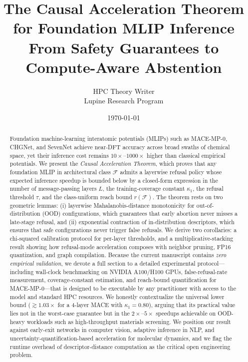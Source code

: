 \documentclass[11pt,a4paper]{article}
\title{\textbf{The Causal Acceleration Theorem for Foundation MLIP Inference}\\\large From Safety Guarantees to Compute-Aware Abstention}
\author{HPC Theory Writer\\Lupine Research Program}
\date{\today}
\begin{document}
\maketitle

\begin{center}
\end{center}

\begin{abstract}
Foundation machine-learning interatomic potentials (MLIPs) such as MACE-MP-0, CHGNet, and SevenNet achieve near-DFT accuracy across broad swaths of chemical space, yet their inference cost remains $10\times$--$1000\times$ higher than classical empirical potentials. We present the \emph{Causal Acceleration Theorem}, which proves that any foundation MLIP in architectural class $\mathcal{F}$ admits a layerwise refusal policy whose expected inference speedup is bounded below by a closed-form expression in the number of message-passing layers $L$, the training-coverage constant $\kappa_1$, the refusal threshold $\tau$, and the class-uniform reach bound $r(\mathcal{F})$. The theorem rests on two geometric lemmas: (i) layerwise Mahalanobis-distance monotonicity for out-of-distribution (OOD) configurations, which guarantees that early abortion never misses a late-stage refusal, and (ii) exponential contraction of in-distribution descriptors, which ensures that safe configurations never trigger false refusals. We derive two corollaries: a chi-squared calibration protocol for per-layer thresholds, and a multiplicative-stacking result showing how refusal-mode acceleration composes with neighbor pruning, FP16 quantization, and graph compilation. Because the current manuscript contains \emph{zero empirical validation}, we devote a full section to a detailed experimental protocol---including wall-clock benchmarking on NVIDIA A100/H100 GPUs, false-refusal-rate measurement, coverage-constant estimation, and reach-bound quantification for MACE-MP-0---that is designed to be executable by any practitioner with access to the model and standard HPC resources. We honestly contextualize the universal lower bound ($\gtrsim 1.03\times$ for a 4-layer MACE with $\kappa_1=0.80$), arguing that its practical value lies not in the worst-case guarantee but in the $2\times$--$5\times$ speedups achievable on OOD-heavy workloads such as high-throughput materials screening. We position our result against early-exit networks in computer vision, adaptive inference in NLP, and uncertainty-quantification-based acceleration for molecular dynamics, and we flag the runtime overhead of descriptor-distance computation as the critical open engineering problem.
\end{abstract}
\end{document}
